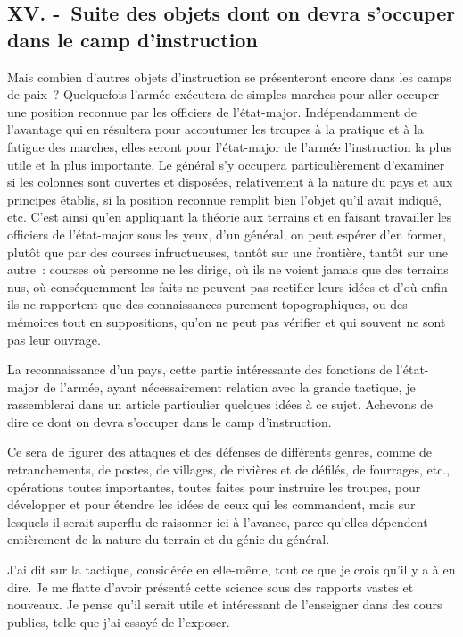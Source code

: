 \documentclass[french,twoside]{book} %
\begin{document}
\subsection[{XV. - Suite des objets dont on devra s’occuper dans le camp d’instruction}]{XV. - Suite des objets dont on devra s’occuper dans le camp d’instruction}
\noindent Mais combien d’autres objets d’instruction se présenteront encore dans les camps de paix ? Quelquefois l’armée exécutera de simples marches pour aller occuper une position reconnue par les officiers de l’état-major. Indépendamment de l’avantage qui en résultera pour accoutumer les troupes à la pratique et à la fatigue des marches, elles seront pour l’état-major de l’armée l’instruction la plus utile et la plus importante. Le général s’y occupera particulièrement d’examiner si les colonnes sont ouvertes et disposées, relativement à la nature du pays et aux principes établis, si la position reconnue remplit bien l’objet qu’il avait indiqué, etc. C’est ainsi qu’en appliquant la théorie aux terrains et en faisant travailler les officiers de l’état-major sous les yeux, d’un général, on peut espérer d’en former, plutôt que par des courses infructueuses, tantôt sur une frontière, tantôt sur une autre : courses où personne ne les dirige, où ils ne voient jamais que des terrains nus, où conséquemment les faits ne peuvent pas rectifier leurs idées et d’où enfin ils ne rapportent que des connaissances purement topographiques, ou des mémoires tout en suppositions, qu’on ne peut pas vérifier et qui souvent ne sont pas leur ouvrage.\par
La reconnaissance d’un pays, cette partie intéressante des fonctions de l’état-major de l’armée, ayant nécessairement relation avec la grande tactique, je rassemblerai dans un article particulier quelques idées à ce sujet. Achevons de dire ce dont on devra s’occuper dans le camp d’instruction.\par
Ce sera de figurer des attaques et des défenses de différents genres, comme de retranchements, de postes, de villages, de rivières et de défilés, de fourrages, etc., opérations toutes importantes, toutes faites pour instruire les troupes, pour développer et pour étendre les idées de ceux qui les commandent, mais sur lesquels il serait superflu de raisonner ici à l’avance, parce qu’elles dépendent entièrement de la nature du terrain et du génie du général.\par
J’ai dit sur la tactique, considérée en elle-même, tout ce que je crois qu’il y a à en dire. Je me flatte d’avoir présenté cette science sous des rapports vastes et nouveaux. Je pense qu’il serait utile et intéressant de l’enseigner dans des cours publics, telle que j’ai essayé de l’exposer.\par
\end{document}
